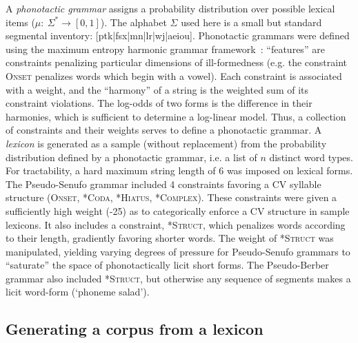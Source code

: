 \documentclass[11pt]{article}
\begin{document}
A \textit{phonotactic grammar} assigns a probability distribution over possible lexical items ($\mu:~\Sigma^* \rightarrow[0,1]$). The alphabet $\Sigma$ used here is a small but standard segmental inventory: [ptk|fsx|mn|lr|wj|aeiou]. Phonotactic grammars were defined using the maximum entropy harmonic grammar framework~\cite{Hayes08a}: ``features'' are constraints penalizing particular dimensions of ill-formedness (e.g. the constraint \textsc{Onset} penalizes words which begin with a vowel). Each constraint is associated with a weight, and the ``harmony'' of a string is the weighted sum of its constraint violations. The log-odds of two forms is the difference in their harmonies, which is sufficient to determine a log-linear model. Thus, a collection of constraints and their weights serves to define a phonotactic grammar. A \textit{lexicon} is generated as a sample (without replacement) from the probability distribution defined by a phonotactic grammar, i.e. a list of $n$ distinct word types. For tractability, a hard maximum string length of 6 was imposed on lexical forms. The Pseudo-Senufo grammar included 4 constraints favoring a CV syllable structure (\textsc{Onset, *Coda, *Hiatus, *Complex}). These constraints were given a sufficiently high weight (-25) as to categorically enforce a CV structure in sample lexicons. It also includes a constraint, \textsc{*Struct}, which penalizes words according to their length, gradiently favoring shorter words. The weight of \textsc{*Struct} was manipulated, yielding varying degrees of pressure for Pseudo-Senufo grammars to ``saturate'' the space of phonotactically licit short forms. The Pseudo-Berber grammar also included \textsc{*Struct}, but otherwise any sequence of segments makes a licit word-form (`phoneme salad'). 

\subsection{Generating a corpus from a lexicon}
\end{document}
